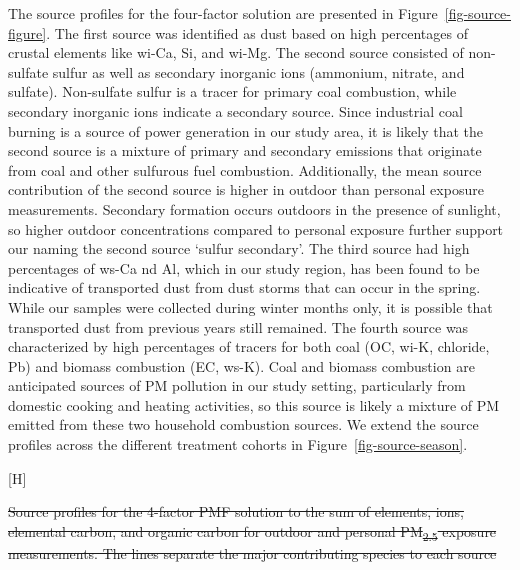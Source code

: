\documentclass[
  letterpaper,
  DIV=11,
  numbers=noendperiod]{scrartcl}
\makeatletter
\renewenvironment{figure}%
   {\renewcommand\familydefault\sfdefault
    \@float{figure}}
   {\end@float}
\providecommand{\DIFadd}[1]{{\protect\color{blue}\underline{#1}}} %
\providecommand{\DIFdel}[1]{{\protect\color{red}\sout{#1}}}                      %
\providecommand{\DIFaddFL}[1]{\DIFadd{#1}} %
\providecommand{\DIFdelFL}[1]{\DIFdel{#1}} %
\providecommand{\DIFaddbeginFL}{} %
\providecommand{\DIFaddendFL}{} %
\providecommand{\DIFdelbeginFL}{} %
\providecommand{\DIFdelendFL}{} %
\newcommand{\DIFscaledelfig}{0.5}
\newlength{\DIFdelgraphicswidth} %
\newlength{\DIFdelgraphicsheight} %
\newcommand{\DIFaddincludegraphics}[2][]{{\color{blue}\fbox{\DIFOincludegraphics[#1]{#2}}}} %
\newcommand{\DIFdelincludegraphics}[2][]{%
\sbox{\DIFdelgraphicsbox}{\DIFOincludegraphics[#1]{#2}}%
\settoboxwidth{\DIFdelgraphicswidth}{\DIFdelgraphicsbox} %
\settoboxtotalheight{\DIFdelgraphicsheight}{\DIFdelgraphicsbox} %
\scalebox{\DIFscaledelfig}{%
\parbox[b]{\DIFdelgraphicswidth}{\usebox{\DIFdelgraphicsbox}\\[-\baselineskip] \rule{\DIFdelgraphicswidth}{0em}}\llap{\resizebox{\DIFdelgraphicswidth}{\DIFdelgraphicsheight}{%
\setlength{\unitlength}{\DIFdelgraphicswidth}%
\begin{picture}(1,1)%
\thicklines\linethickness{2pt} %
{\color[rgb]{1,0,0}\put(0,0){\framebox(1,1){}}}%
{\color[rgb]{1,0,0}\put(0,0){\line( 1,1){1}}}%
{\color[rgb]{1,0,0}\put(0,1){\line(1,-1){1}}}%
\end{picture}%
}\hspace*{3pt}}} %
} %
\DeclareRobustCommand{\DIFaddbeginFL}{\DIFOaddbeginFL \let\includegraphics\DIFaddincludegraphics} %
\DeclareRobustCommand{\DIFaddendFL}{\DIFOaddendFL \let\includegraphics\DIFOincludegraphics} %
\DeclareRobustCommand{\DIFdelbeginFL}{\DIFOdelbeginFL \let\includegraphics\DIFdelincludegraphics} %
\DeclareRobustCommand{\DIFdelendFL}{\DIFOaddendFL \let\includegraphics\DIFOincludegraphics} %
\makeatother
\begin{document}
The source profiles for the four-factor solution are presented in
Figure~\ref{fig-source-figure}. The first source was identified as dust
based on high percentages of crustal elements like wi-Ca, Si, and wi-Mg.
The second source consisted of non-sulfate sulfur as well as secondary
inorganic ions (ammonium, nitrate, and sulfate). Non-sulfate sulfur is a
tracer for primary coal combustion, while secondary inorganic ions
indicate a secondary source. Since industrial coal burning is a source
of power generation in our study area, it is likely that the second
source is a mixture of primary and secondary emissions that originate
from coal and other sulfurous fuel combustion. Additionally, the mean
source contribution of the second source is higher in outdoor than
personal exposure measurements. Secondary formation occurs outdoors in
the presence of sunlight, so higher outdoor concentrations compared to
personal exposure further support our naming the second source `sulfur
secondary'. The third source had high percentages of ws-Ca nd Al, which
in our study region, has been found to be indicative of transported dust
from dust storms that can occur in the spring. While our samples were
collected during winter months only, it is possible that transported
dust from previous years still remained. The fourth source was
characterized by high percentages of tracers for both coal (OC, wi-K,
chloride, Pb) and biomass combustion (EC, ws-K). Coal and biomass
combustion are anticipated sources of PM pollution in our study setting,
particularly from domestic cooking and heating activities, so this
source is likely a mixture of PM emitted from these two household
combustion sources. We extend the source profiles across the different
treatment cohorts in Figure~\ref{fig-source-season}.

\begin{figure}[H]

\DIFdelbeginFL %
\DIFdelendFL \DIFaddbeginFL {}
\DIFaddendFL 

\DIFdelbeginFL %
\DIFdelendFL \DIFaddbeginFL \caption{\label{fig-source-figure}\DIFaddFL{Source profiles for the 4-factor PMF
solution to the sum of elements, ions, elemental carbon, and organic
carbon for outdoor and personal PM\textsubscript{2.5} exposure
measurements. The lines separate the major contributing species to each
source.}}
\DIFaddendFL 

\DIFdelbeginFL %
{%
\DIFdelFL{Source profiles for the 4-factor PMF
solution to the sum of elements, ions, elemental carbon, and organic
carbon for outdoor and personal PM\textsubscript{2.5} exposure
measurements. The lines separate the major contributing species to each
source}}

\DIFdelendFL \end{figure}%
\end{document}
